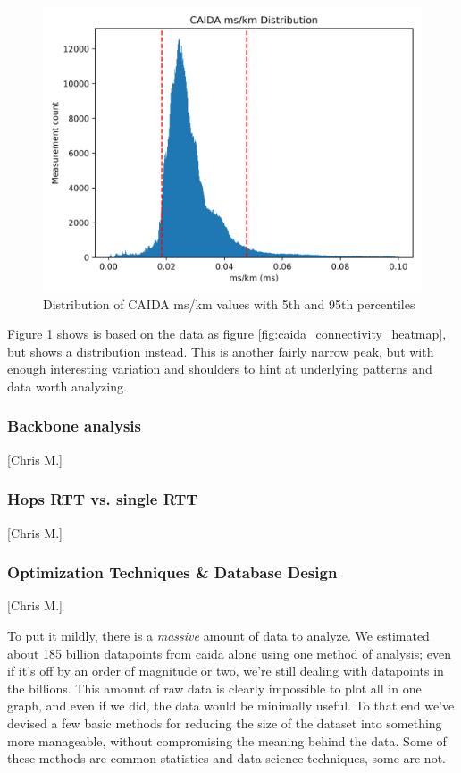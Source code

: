 \documentclass[12pt]{article}
\begin{document}
\begin{figure}[H]
    \centering
    \includegraphics[width=\textwidth]{images/CAIDA_connect_dist.png}
    \caption{Distribution of CAIDA ms/km values with 5th and 95th percentiles}
    \label{fig:caida_connectivity_dist}
\end{figure}

Figure \ref{fig:caida_connectivity_dist} shows is based on the data as figure \ref{fig:caida_connectivity_heatmap}, but shows a distribution instead. This is another fairly narrow peak, but with enough interesting variation and shoulders to hint at underlying patterns and data worth analyzing.

\subsubsection{Backbone analysis}[Chris M.]
\subsubsection{Hops RTT vs. single RTT}[Chris M.]
\label{sec:optimization}\subsubsection{Optimization Techniques \& Database Design}[Chris M.]

To put it mildly, there is a \textit{massive} amount of data to analyze. We estimated about 185 billion datapoints from \acrshort{caida} alone using one method of analysis; even if it's off by an order of magnitude or two, we're still dealing with datapoints in the billions. This amount of raw data is clearly impossible to plot all in one graph, and even if we did, the data would be minimally useful. To that end we've devised a few basic methods for reducing the size of the dataset into something more manageable, without compromising the meaning behind the data. Some of these methods are common statistics and data science techniques, some are not.
\end{document}
